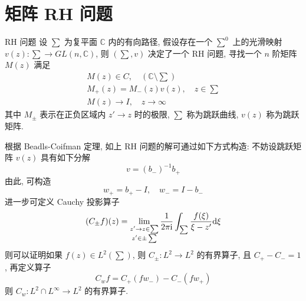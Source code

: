 \section{矩阵 RH 问题}
\begin{definition}{RH 问题}
  设 $ \sum $ 为复平面 $ \mathbb{C} $ 内的有向路径, 假设存在一个 $ {\sum} ^{0} $ 上的光滑映射 $ v(z) : \sum \to GL(n,\mathbb{C}) $, 则 $ (\sum, v) $ 决定了一个 RH 问题, 寻找一个 $ n $ 阶矩阵 $ M(z) $ 满足 
  \begin{align}
    M(z) \in C, \quad ( \mathbb{C}\setminus  \sum ) \label{eq:RH-analytical-condition}\\
    M_{+}(z) = M_{-}(z)v(z), \quad z\in \sum \label{eq:RH-Matrix-jump-condition}\\
    M(z) \to I ,\quad z \to \infty \label{eq:RH-Matrix-asymptotic-condition}
  \end{align}
  其中 $ M_{\pm} $ 表示在正负区域内 $ z' \to z $ 时的极限, $ \sum $ 称为跳跃曲线, $ v(z) $ 称为跳跃矩阵. 
\end{definition}

根据 Beadls-Coifman 定理, 如上 RH 问题的解可通过如下方式构造: 不妨设跳跃矩阵 $ v(z) $ 具有如下分解
\begin{equation}
  v = (b_{-})^{-1}b_{+}
\end{equation}
由此, 可构造
\begin{equation}
  w_{+} = b_{+} - I, \quad w_{-} = I - b_{-}
\end{equation}
进一步可定义 Cauchy 投影算子
\begin{equation}
  (C_{\pm} f)(z) = \lim_{\substack{z' \to z \in \sum \\ z' \in \pm \sum}} \frac{1}{2 \pi \mathrm{i}} \int_{\sum} \frac{f(\xi)}{\xi - z'} \mathrm{d} \xi \label{eq:Cauchy-projection}
\end{equation}
则可以证明如果 $ f(z) \in L^{2}(\sum) $, 则 $ C_{\pm} : L^{2} \to L^{2} $ 的有界算子, 且 $ C_{+} - C_{-} = 1 $, 再定义算子
\begin{equation}
  C_{w}f = C_{+}(fw_{-}) - C_{-}(fw_{+}) \label{eq:Cauchy-projection-operator}
\end{equation}
则 $ C_{w}: L^{2} \cap L^{\infty} \to L^2 $ 的有界算子.

